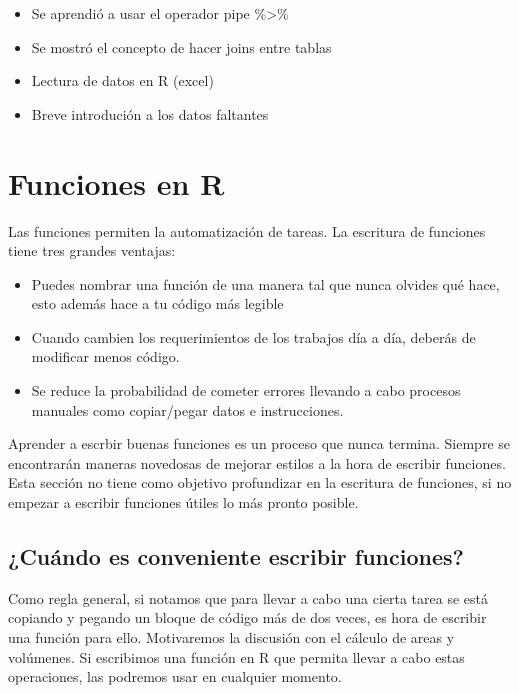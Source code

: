 \documentclass[]{book}
\providecommand{\tightlist}{%
  \setlength{\itemsep}{0pt}\setlength{\parskip}{0pt}}
\theoremstyle{definition}
\theoremstyle{definition}
\theoremstyle{definition}
\theoremstyle{remark}
\begin{document}
\begin{itemize}
\tightlist
\item
  Se aprendió a usar el operador pipe \%\textgreater{}\%
\item
  Se mostró el concepto de hacer joins entre tablas
\item
  Lectura de datos en R (excel)
\item
  Breve introdución a los datos faltantes
\end{itemize}

\section{Funciones en R}\label{funciones-en-r-1}

Las funciones permiten la automatización de tareas. La escritura de
funciones tiene tres grandes ventajas:

\begin{itemize}
\tightlist
\item
  Puedes nombrar una función de una manera tal que nunca olvides qué
  hace, esto además hace a tu código más legible
\item
  Cuando cambien los requerimientos de los trabajos día a día, deberás
  de modificar menos código.
\item
  Se reduce la probabilidad de cometer errores llevando a cabo procesos
  manuales como copiar/pegar datos e instrucciones.
\end{itemize}

Aprender a escrbir buenas funciones es un proceso que nunca termina.
Siempre se encontrarán maneras novedosas de mejorar estilos a la hora de
escribir funciones. Esta sección no tiene como objetivo profundizar en
la escritura de funciones, si no empezar a escribir funciones útiles lo
más pronto posible.

\subsection{¿Cuándo es conveniente escribir
funciones?}\label{cuando-es-conveniente-escribir-funciones}

Como regla general, si notamos que para llevar a cabo una cierta tarea
se está copiando y pegando un bloque de código más de dos veces, es hora
de escribir una función para ello. Motivaremos la discusión con el
cálculo de areas y volúmenes. Si escribimos una función en R que permita
llevar a cabo estas operaciones, las podremos usar en cualquier momento.
\end{document}

